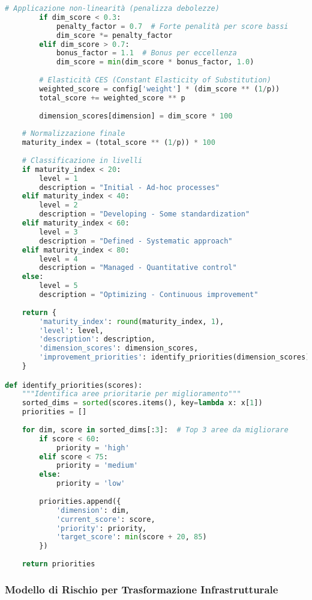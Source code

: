 \begin{lstlisting}[language=Python, caption=Calcolo Indice Maturità con Elasticità Non-Lineare]
        # Applicazione non-linearità (penalizza debolezze)
        if dim_score < 0.3:
            penalty_factor = 0.7  # Forte penalità per score bassi
            dim_score *= penalty_factor
        elif dim_score > 0.7:
            bonus_factor = 1.1  # Bonus per eccellenza
            dim_score = min(dim_score * bonus_factor, 1.0)
        
        # Elasticità CES (Constant Elasticity of Substitution)
        weighted_score = config['weight'] * (dim_score ** (1/p))
        total_score += weighted_score ** p
        
        dimension_scores[dimension] = dim_score * 100
    
    # Normalizzazione finale
    maturity_index = (total_score ** (1/p)) * 100
    
    # Classificazione in livelli
    if maturity_index < 20:
        level = 1
        description = "Initial - Ad-hoc processes"
    elif maturity_index < 40:
        level = 2
        description = "Developing - Some standardization"
    elif maturity_index < 60:
        level = 3
        description = "Defined - Systematic approach"
    elif maturity_index < 80:
        level = 4
        description = "Managed - Quantitative control"
    else:
        level = 5
        description = "Optimizing - Continuous improvement"
    
    return {
        'maturity_index': round(maturity_index, 1),
        'level': level,
        'description': description,
        'dimension_scores': dimension_scores,
        'improvement_priorities': identify_priorities(dimension_scores)
    }

def identify_priorities(scores):
    """Identifica aree prioritarie per miglioramento"""
    sorted_dims = sorted(scores.items(), key=lambda x: x[1])
    priorities = []
    
    for dim, score in sorted_dims[:3]:  # Top 3 aree da migliorare
        if score < 60:
            priority = 'high'
        elif score < 75:
            priority = 'medium'
        else:
            priority = 'low'
        
        priorities.append({
            'dimension': dim,
            'current_score': score,
            'priority': priority,
            'target_score': min(score + 20, 85)
        })
    
    return priorities
\end{lstlisting}

\subsubsection{Modello di Rischio per Trasformazione Infrastrutturale}

